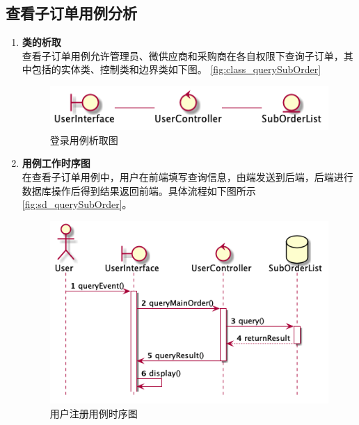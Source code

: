 	\subsection{查看子订单用例分析} %
	\label{sub:查看子订单用例分析}
	\begin{enumerate}
		\item \textbf{类的析取} \\
		查看子订单用例允许管理员、微供应商和采购商在各自权限下查询子订单，其中包括的实体类、控制类和边界类如下图。
		\autoref{fig:class_querySubOrder}
		\begin{figure}[htp]
		    \centering
		    \includegraphics[width=12cm]{misc/figure_src/class_diagram/querySubOrder.png}
		    \caption{登录用例析取图}
		    \label{fig:class_commit}
		\end{figure}

		\item \textbf{用例工作时序图} \\
		在查看子订单用例中，用户在前端填写查询信息，由端发送到后端，后端进行数据库操作后得到结果返回前端。具体流程如下图所示\autoref{fig:sd_querySubOrder}。

		\begin{figure}[htp]
		    \centering
		    \includegraphics[width=12cm]{misc/figure_src/sequence_diagram/sd_querySubOrder.png}
		    \caption{用户注册用例时序图}
		    \label{fig:sd_querySubOrder}
		\end{figure}
	\end{enumerate}
	
